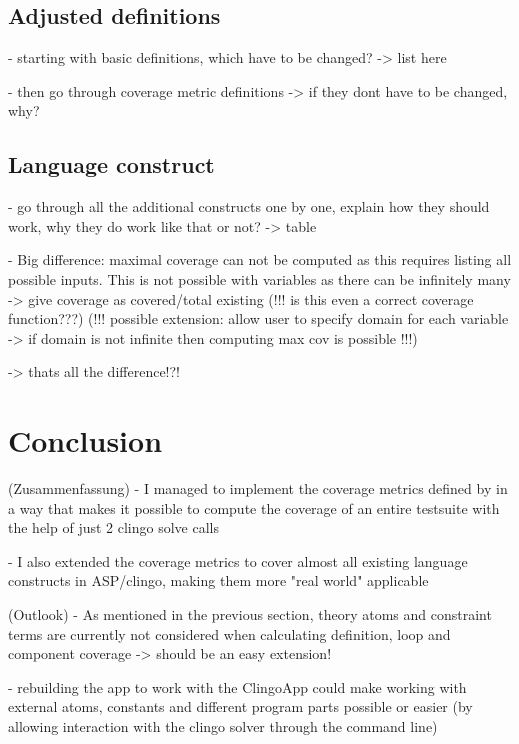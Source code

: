 \section{Adjusted definitions}
\label{sec:Coverage for further program classes/Adjusted definitions}
- starting with basic definitions, which have to be changed? -> list here

- then go through coverage metric definitions -> if they dont have to be changed, why?

\section{Language construct}
\label{sec:Coverage for further program classes/Language constructs}
- go through all the additional constructs one by one, explain how they should work, why they do work like that or not?
-> table

- Big difference: maximal coverage can not be computed as this requires listing all possible inputs. This is not possible with variables 
as there can be infinitely many -> give coverage as covered/total existing (!!! is this even a correct coverage function???)
(!!! possible extension: allow user to specify domain for each variable -> if domain is not infinite then computing max cov is possible !!!) 

-> thats all the difference!?!

\chapter{Conclusion}
\label{ch:Conclusion}
(Zusammenfassung)
- I managed to implement the coverage metrics defined by \textcite{Jan+10} in a way that makes it possible to compute the coverage 
of an entire testsuite with the help of just 2 clingo solve calls

- I also extended the coverage metrics to cover almost all existing language constructs in ASP/clingo, making them more "real world" 
applicable


(Outlook)
- As mentioned in the previous section, theory atoms and constraint terms are currently not considered when calculating definition, loop 
and component coverage -> should be an easy extension!

- rebuilding the app to work with the ClingoApp could make working with external atoms, constants and different program parts possible 
or easier (by allowing interaction with the clingo solver through the command line)

